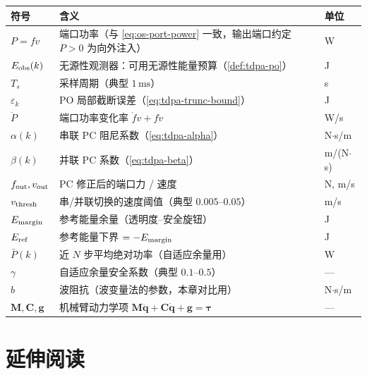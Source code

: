 \begin{center}
\small
\begin{tabular}{p{} p{} p{}}
\toprule
符号 & 含义 & 单位 \\
\midrule
$P=fv$ & 端口功率（与 \cref{eq:os-port-power} 一致，输出端口约定 $P>0$ 为向外注入） & W \\
$E_{\rm obs}(k)$ & 无源性观测器：可用无源性能量预算（\cref{def:tdpa-po}） & J \\
$T_s$ & 采样周期（典型 $1\,\mathrm{ms}$） & s \\
$\varepsilon_k$ & PO 局部截断误差（\cref{eq:tdpa-trunc-bound}） & J \\
$\dot P$ & 端口功率变化率 $\dot f v+f\dot v$ & W/s \\
$\alpha(k)$ & 串联 PC 阻尼系数（\cref{eq:tdpa-alpha}） & N$\cdot$s/m \\
$\beta(k)$ & 并联 PC 系数（\cref{eq:tdpa-beta}） & m/(N$\cdot$s) \\
$f_{\rm out},v_{\rm out}$ & PC 修正后的端口力 / 速度 & N, m/s \\
$v_{\rm thresh}$ & 串/并联切换的速度阈值（典型 $0.005$–$0.05$） & m/s \\
$E_{\rm margin}$ & 参考能量余量（透明度–安全旋钮） & J \\
$E_{\rm ref}$ & 参考能量下界 $=-E_{\rm margin}$ & J \\
$\bar P(k)$ & 近 $N$ 步平均绝对功率（自适应余量用） & W \\
$\gamma$ & 自适应余量安全系数（典型 $0.1$–$0.5$） & — \\
$b$ & 波阻抗（波变量法的参数，本章对比用） & N$\cdot$s/m \\
$\mathbf M,\mathbf C,\mathbf g$ & 机械臂动力学项 $\mathbf M\ddot{\mathbf q}+\mathbf C\dot{\mathbf q}+\mathbf g=\boldsymbol\tau$ & — \\
\bottomrule
\end{tabular}
\end{center}

\section{延伸阅读}
\label{sec:tdpa-further}

